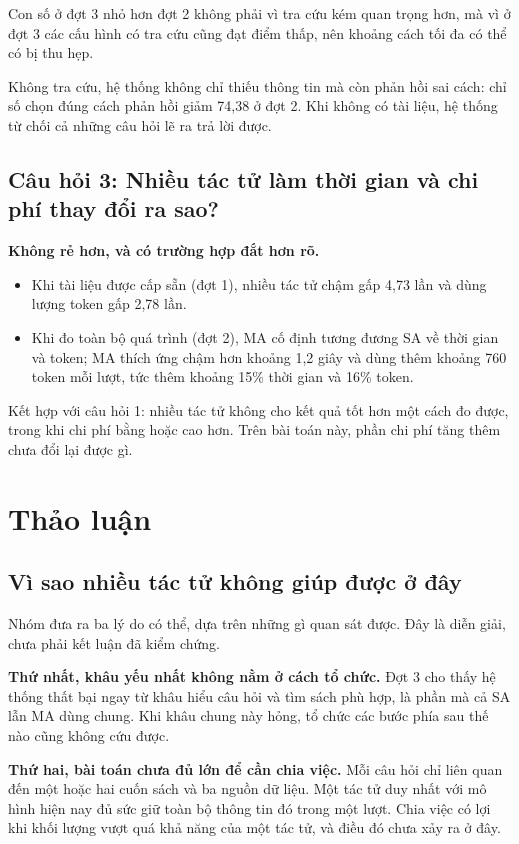 Con số ở đợt 3 nhỏ hơn đợt 2 không phải vì tra cứu kém quan trọng hơn, mà vì ở đợt 3 các cấu hình có tra cứu cũng đạt điểm thấp, nên khoảng cách tối đa có thể có bị thu hẹp.

Không tra cứu, hệ thống không chỉ thiếu thông tin mà còn phản hồi sai cách: chỉ số chọn đúng cách phản hồi giảm 74,38 \pp{} ở đợt 2. Khi không có tài liệu, hệ thống từ chối cả những câu hỏi lẽ ra trả lời được.

\subsection{Câu hỏi 3: Nhiều tác tử làm thời gian và chi phí thay đổi ra sao?}

\textbf{Không rẻ hơn, và có trường hợp đắt hơn rõ.}

\begin{itemize}
    \item Khi tài liệu được cấp sẵn (đợt 1), nhiều tác tử chậm gấp 4,73 lần và dùng lượng token gấp 2,78 lần.
    \item Khi đo toàn bộ quá trình (đợt 2), MA cố định tương đương SA về thời gian và token; MA thích ứng chậm hơn khoảng 1,2 giây và dùng thêm khoảng 760 token mỗi lượt, tức thêm khoảng 15\% thời gian và 16\% token.
\end{itemize}

Kết hợp với câu hỏi 1: nhiều tác tử không cho kết quả tốt hơn một cách đo được, trong khi chi phí bằng hoặc cao hơn. Trên bài toán này, phần chi phí tăng thêm chưa đổi lại được gì.

\section{Thảo luận}

\subsection{Vì sao nhiều tác tử không giúp được ở đây}

Nhóm đưa ra ba lý do có thể, dựa trên những gì quan sát được. Đây là diễn giải, chưa phải kết luận đã kiểm chứng.

\textbf{Thứ nhất, khâu yếu nhất không nằm ở cách tổ chức.} Đợt 3 cho thấy hệ thống thất bại ngay từ khâu hiểu câu hỏi và tìm sách phù hợp, là phần mà cả SA lẫn MA dùng chung. Khi khâu chung này hỏng, tổ chức các bước phía sau thế nào cũng không cứu được.

\textbf{Thứ hai, bài toán chưa đủ lớn để cần chia việc.} Mỗi câu hỏi chỉ liên quan đến một hoặc hai cuốn sách và ba nguồn dữ liệu. Một tác tử duy nhất với mô hình hiện nay đủ sức giữ toàn bộ thông tin đó trong một lượt. Chia việc có lợi khi khối lượng vượt quá khả năng của một tác tử, và điều đó chưa xảy ra ở đây.


